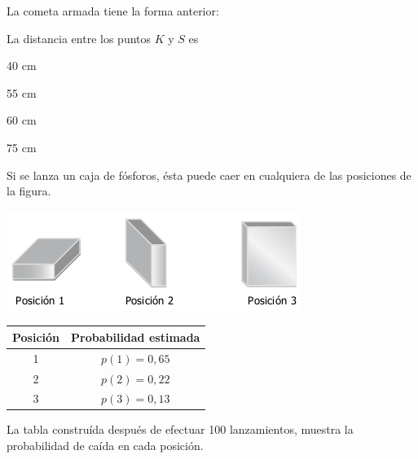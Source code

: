 \documentclass[letterpaper,fleqn]{article}
\begin{document}
\begin{enumerate}
\begin{minipage}{.5\textwidth}
\end{minipage}
\begin{minipage}{.45\textwidth}
La cometa armada tiene la forma anterior:
\end{minipage}
La distancia entre los puntos $K$ y $S$ es
\begin{enumerate}
\begin{multicols}{4}
\item 40 cm
\item 55 cm
\item 60 cm
\item 75 cm
\end{multicols}
\end{enumerate}

    \begin{minipage}{.4\textwidth}
      \item Si se lanza un caja de fósforos, ésta puede caer en cualquiera de las posiciones de la figura.
  \end{minipage}\hfill
  \begin{minipage}{.55\textwidth}
    \begin{center}
  \includegraphics[scale=.55]{Images/fosforos.png}
  \end{center}
  \end{minipage}
  \begin{minipage}{.5\textwidth}
      \begin{center}
  \begin{tabular}{|c|c|}\hline
  \textbf{Posición}&\textbf{Probabilidad estimada}\\\hline
    1 & $ p(1)=0,65 $\\\hline
    2 & $ p(2)=0,22 $\\\hline
    3 & $ p(3)=0,13 $\\\hline
  \end{tabular}
  \end{center}
  \end{minipage}\hfill
  \begin{minipage}{.45\textwidth}
    La tabla construída después de efectuar 100 lanzamientos, muestra la probabilidad de caída en cada posición.
  \end{minipage}
  

\end{enumerate}
\end{document}
